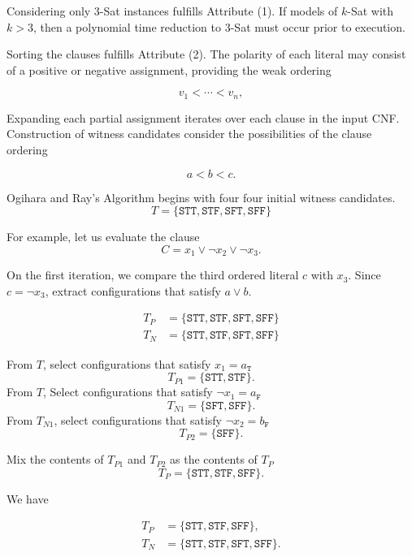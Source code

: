 Considering only $3$-{\sc Sat} instances fulfills Attribute (1).  If models of $k$-{\sc Sat} with $k > 3$, then a polynomial time reduction to $3$-{\sc Sat} must occur prior to execution.

Sorting the clauses fulfills Attribute (2).  The polarity of each literal may consist of a positive or negative assignment, providing the weak ordering

\[
v_1 < \cdots < v_n,
\]




\FloatBarrier



Expanding each partial assignment iterates over each clause in the input CNF.  Construction of witness candidates consider the possibilities of the clause ordering

\[
a < b < c.
\]


{\sc Ogihara and Ray's Algorithm} begins with four four initial witness candidates. 
\[
T = \{ \texttt{STT}, \texttt{STF}, \texttt{SFT}, \texttt{SFF}\}
\]

For example, let us evaluate the clause
\[
C = x_1 \vee \neg x_2 \vee \neg x_3.
\]

On the first iteration, we compare the third ordered literal $c$ with $x_3$.  Since $c = \neg x_3$, extract configurations that satisfy $a \vee b$.  

\begin{align*}
T_P &= \{ \texttt{STT}, \texttt{STF}, \texttt{SFT}, \texttt{SFF}\} \\
T_N &= \{ \texttt{STT}, \texttt{STF}, \texttt{SFT}, \texttt{SFF}\} 
\end{align*}

\noindent From $T$, select configurations that satisfy $x_1 = a_{\texttt{T}}$
\[
T_{P1} = \{ \texttt{STT}, \texttt{STF} \}.
\]
\noindent From $T$, Select configurations that satisfy $\neg x_1 = a_{\texttt{F}}$
\[
T_{N1} = \{ \texttt{SFT}, \texttt{SFF} \}.
\]
\noindent From $T_{N1}$, select configurations that satisfy $\neg x_2 = b_{\texttt{F}}$
\[
T_{P2} = \{ \texttt{SFF} \}.
\]

\noindent Mix the contents of $T_{P1}$ and $T_{P2}$ as the contents of $T_P$
\[
T_P = \{ \texttt{STT}, \texttt{STF}, \texttt{SFF} \}.
\]

\noindent We have 

\begin{align*}
T_P &= \{ \texttt{STT}, \texttt{STF}, \texttt{SFF} \}, \\
T_N &= \{ \texttt{STT}, \texttt{STF}, \texttt{SFT}, \texttt{SFF}\}.
\end{align*}


